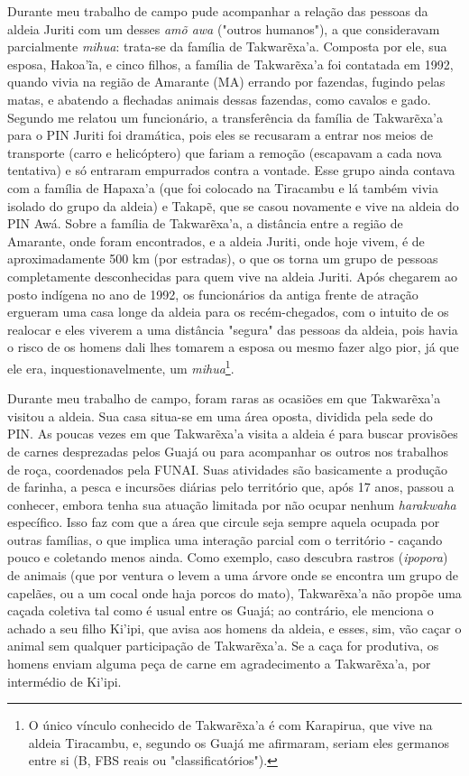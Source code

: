 Durante meu trabalho de campo pude acompanhar a relação das pessoas da
aldeia Juriti com um desses \emph{amõ awa} ("outros humanos"), a que
consideravam parcialmente \emph{mihua}: trata-se da família de
Takwarẽxa'a. Composta por ele, sua esposa, Hakoa'ĩa, e cinco filhos, a
família de Takwarẽxa'a foi contatada em 1992, quando vivia na região de
Amarante (MA) errando por fazendas, fugindo pelas matas, e abatendo a
flechadas animais dessas fazendas, como cavalos e gado. Segundo me
relatou um funcionário, a transferência da família de Takwarẽxa'a para o
PIN Juriti foi dramática, pois eles se recusaram a entrar nos meios de
transporte (carro e helicóptero) que fariam a remoção (escapavam a cada
nova tentativa) e só entraram empurrados contra a vontade. Esse grupo
ainda contava com a família de Hapaxa'a (que foi colocado na Tiracambu e
lá também vivia isolado do grupo da aldeia) e Takapẽ, que se casou
novamente e vive na aldeia do PIN Awá. Sobre a família de Takwarẽxa'a, a
distância entre a região de Amarante, onde foram encontrados, e a aldeia
Juriti, onde hoje vivem, é de aproximadamente 500 km (por estradas), o
que os torna um grupo de pessoas completamente desconhecidas para quem
vive na aldeia Juriti. Após chegarem ao posto indígena no ano de 1992,
os funcionários da antiga frente de atração ergueram uma casa longe da
aldeia para os recém-chegados, com o intuito de os realocar e eles
viverem a uma distância "segura" das pessoas da aldeia, pois havia o
risco de os homens dali lhes tomarem a esposa ou mesmo fazer algo pior,
já que ele era, inquestionavelmente, um \emph{mihua}\footnote{O único
  vínculo conhecido de Takwarẽxa'a é com Karapirua, que vive na aldeia
  Tiracambu, e, segundo os Guajá me afirmaram, seriam eles germanos
  entre si (B, FBS reais ou "classificatórios").}.

Durante meu trabalho de campo, foram raras as ocasiões em que
Takwarẽxa'a visitou a aldeia. Sua casa situa-se em uma área oposta,
dividida pela sede do PIN. As poucas vezes em que Takwarẽxa'a visita a
aldeia é para buscar provisões de carnes desprezadas pelos Guajá ou para
acompanhar os outros nos trabalhos de roça, coordenados pela FUNAI. Suas
atividades são basicamente a produção de farinha, a pesca e incursões
diárias pelo território que, após 17 anos, passou a conhecer, embora
tenha sua atuação limitada por não ocupar nenhum \emph{harakwaha}
específico. Isso faz com que a área que circule seja sempre aquela
ocupada por outras famílias, o que implica uma interação parcial com o
território - caçando pouco e coletando menos ainda. Como exemplo, caso
descubra rastros (\emph{ipopora}) de animais (que por ventura o levem a
uma árvore onde se encontra um grupo de capelães, ou a um cocal onde
haja porcos do mato), Takwarẽxa'a não propõe uma caçada coletiva tal
como é usual entre os Guajá; ao contrário, ele menciona o achado a seu
filho Ki'ipi, que avisa aos homens da aldeia, e esses, sim, vão caçar o
animal sem qualquer participação de Takwarẽxa'a. Se a caça for
produtiva, os homens enviam alguma peça de carne em agradecimento a
Takwarẽxa'a, por intermédio de Ki'ipi.

